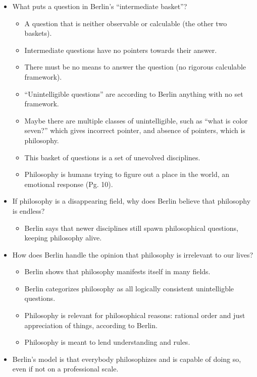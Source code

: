 \documentclass{report}
\begin{document}
\begin{itemize}
\item What puts a question in Berlin's "`intermediate basket"'?

\begin{itemize}
\item A question that is neither observable or calculable (the other two baskets).
\item Intermediate questions have no pointers towards their answer.
\item There must be no means to answer the question (no rigorous calculable framework).
\item "`Unintelligible questions"' are according to Berlin anything with no set framework.
\item Maybe there are multiple classes of unintelligible, such as "`what is color seven?"' which gives incorrect pointer, and absence of pointers, which is philosophy.
\item This basket of questions is a set of unevolved disciplines. 
\item Philosophy is humans trying to figure out a place in the world, an emotional response (Pg. 10).
\end{itemize}

\item If philosophy is a disappearing field, why does Berlin believe that philosophy is endless?

\begin{itemize}
\item Berlin says that newer disciplines still spawn philosophical questions, keeping philosophy alive.
\end{itemize}

\item How does Berlin handle the opinion that philosophy is irrelevant to our lives?

\begin{itemize}
\item Berlin shows that philosophy manifests itself in many fields.
\item Berlin categorizes philosophy as all logically consistent unintelligble questions.
\item Philosophy is relevant for philosophical reasons: rational order and just appreciation of things, according to Berlin. 
\item Philosophy is meant to lend understanding and rules. 
\end{itemize}

\item Berlin's model is that everybody philosophizes and is capable of doing so, even if not on a professional scale.

\end{itemize}
\end{document}
